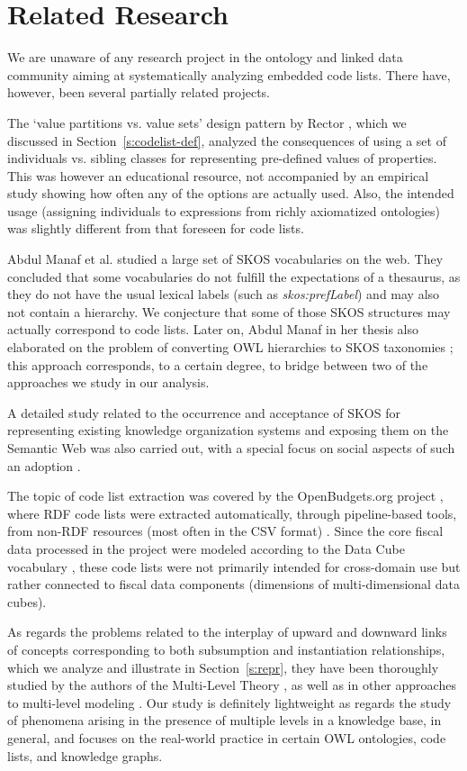 \section{Related Research}
\label{s:related}
We are unaware of any research project in the ontology and linked data community aiming at systematically analyzing embedded code lists. 
There have, however, been several partially related projects.

The `value partitions vs. value sets' design pattern by Rector \cite{alanrector}, which we discussed in Section~\ref{s:codelist-def}, analyzed the consequences of using a set of individuals vs. sibling classes for representing pre-defined values of properties.
This was however an educational resource, not accompanied by an empirical study showing how often any of the options are actually used.
Also, the intended usage (assigning individuals to expressions from richly axiomatized ontologies) was slightly different from that foreseen for code lists.

Abdul Manaf et al. \cite{Yati_eswc12} studied a large set of SKOS vocabularies on the web.
They concluded that some vocabularies do not fulfill the expectations of a thesaurus, as they do not have the usual lexical labels (such as \emph{skos:prefLabel}) and may also not contain a hierarchy.
We conjecture that some of those SKOS structures may actually correspond to code lists.
Later on, Abdul Manaf in her thesis also elaborated on the problem of converting OWL hierarchies to SKOS taxonomies \cite{Yati-thesis}; this approach corresponds, to a certain degree, to bridge between two of the approaches we study in our analysis.

A detailed study related to the occurrence and acceptance of SKOS for representing existing knowledge organization systems and exposing them on the Semantic Web was also carried out, with a special focus on social aspects of such an adoption \cite{DBLP:journals/corr/abs-1801-04479}.


The topic of code list extraction was covered by the OpenBudgets.org project \cite{DBLP:conf/icwe/MusyaffaHLOJAV18}, where RDF code lists were extracted automatically, through pipeline-based tools, from non-RDF resources (most often in the CSV format) \cite{DBLP:conf/smap/FilippidisKKIB16}.
Since the core fiscal data processed in the project were modeled according to the Data Cube vocabulary \cite{data_cube}, these code lists were not primarily intended for cross-domain use but rather connected to fiscal data components (dimensions of multi-dimensional data cubes).

As regards the problems related to the interplay of upward and downward links of concepts corresponding to both subsumption and instantiation relationships, which we analyze and illustrate in Section~\ref{s:repr}, they have been thoroughly studied by the authors of the Multi-Level Theory \cite{conf/er/AlmeidaFC17}, as well as in other approaches to multi-level modeling \cite{journals/dagstuhl-reports/AlmeidaFK17}.
Our study is definitely lightweight as regards the study of phenomena arising in the presence of multiple levels in a knowledge base, in general, and focuses on the real-world practice in certain OWL ontologies, code lists, and knowledge graphs.
